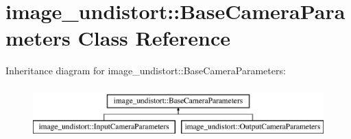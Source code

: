 \hypertarget{classimage__undistort_1_1BaseCameraParameters}{}\section{image\+\_\+undistort\+:\+:Base\+Camera\+Parameters Class Reference}
\label{classimage__undistort_1_1BaseCameraParameters}
Inheritance diagram for image\+\_\+undistort\+:\+:Base\+Camera\+Parameters\+:\begin{figure}[H]
\begin{center}
\leavevmode
\includegraphics[height=2.000000cm]{classimage__undistort_1_1BaseCameraParameters}
\end{center}
\end{figure}
